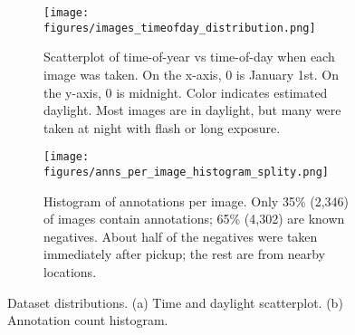 \documentclass{article}
\begin{document}






\begin{figure}[t]
\centering
\begin{subfigure}[t]{0.48\textwidth}
    \centering
    \texttt{[image: figures/images\_timeofday\_distribution.png]}
    \caption{
        Scatterplot of time-of-year vs time-of-day when each image was taken.
        On the x-axis, 0 is January 1st. On the y-axis, 0 is midnight.
        Color indicates estimated daylight.
        Most images are in daylight, but many were taken at night with flash or long exposure.
    }
    \label{fig:TimeOfDayDistribution}
\end{subfigure}
\hfill
\begin{subfigure}[t]{0.48\textwidth}
    \centering
    \texttt{[image: figures/anns\_per\_image\_histogram\_splity.png]}
    \caption{
        Histogram of annotations per image.
        Only 35\% (2,346) of images contain annotations; 65\% (4,302) are known negatives.
        About half of the negatives were taken immediately after pickup; the rest are from nearby locations.
    }
    \label{fig:AnnotsPerImage}
\end{subfigure}
\caption{Dataset distributions. (a) Time and daylight scatterplot. (b) Annotation count histogram.}
\label{fig:TimeAndAnnots}
\end{figure}
\end{document}
